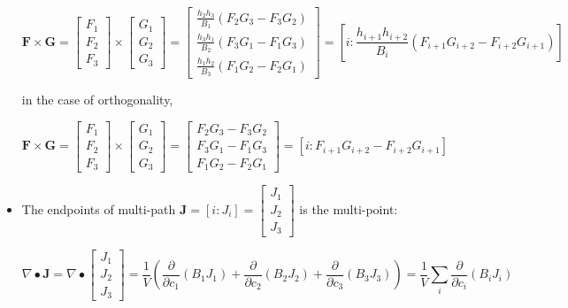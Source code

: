 \begin{itemize}
\[\mathbf{F} \times \mathbf{G} = \begin{bmatrix} F_1 \\ F_2 \\ F_3 \end{bmatrix} \times \begin{bmatrix} G_1 \\ G_2 \\ G_3 \end{bmatrix}
 = \begin{bmatrix} \frac{h_2 h_3}{B_1}(F_2 G_3 - F_3 G_2) \\ \frac{h_3 h_1}{B_2}(F_3 G_1 - F_1 G_3) \\ \frac{h_1 h_2}{B_3}(F_1 G_2 - F_2 G_1) \end{bmatrix}
 = \left[i : \frac{h_{i+1} h_{i+2}}{B_i} (F_{i+1} G_{i+2} - F_{i+2} G_{i+1})\right]\]

in the case of orthogonality,

\[\mathbf{F} \times \mathbf{G} = \begin{bmatrix} F_1 \\ F_2 \\ F_3 \end{bmatrix} \times \begin{bmatrix} G_1 \\ G_2 \\ G_3 \end{bmatrix}
 = \begin{bmatrix} F_2 G_3 - F_3 G_2 \\ F_3 G_1 - F_1 G_3 \\ F_1 G_2 - F_2 G_1 \end{bmatrix}
 = \left[i : F_{i+1} G_{i+2} - F_{i+2} G_{i+1}\right]\]


\item The endpoints of multi-path \(\mathbf{J} = [i : J_i] = \begin{bmatrix} J_1 \\ J_2 \\ J_3 \end{bmatrix}\) is the multi-point:

\[\nabla \bullet \mathbf{J} = \nabla \bullet \begin{bmatrix} J_1 \\ J_2 \\ J_3 \end{bmatrix} = \frac{1}{V}\left(\frac{\partial}{\partial c_1}(B_1 J_1) + \frac{\partial}{\partial c_2}(B_2 J_2) + \frac{\partial}{\partial c_3}(B_3 J_3)\right) = \frac{1}{V}\sum_i \frac{\partial}{\partial c_i} (B_i J_i)\]


\end{itemize}
